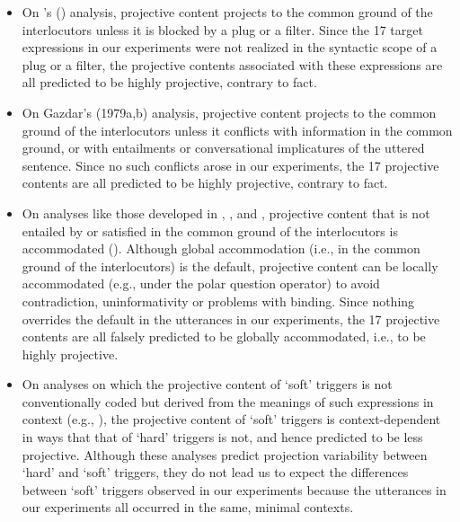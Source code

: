 \documentclass[11pt,fleqn]{article}
\newcommand{\6}{\mbox{$[\hspace*{-.6mm}[$}}
\newcommand{\9}{\mbox{$]\hspace*{-.6mm}]$}}
\newcommand{\citetpos}[1]{\citeauthor{#1}'s (\citeyear{#1})}
\begin{document}
\begin{itemize}[topsep=0pt,itemsep=-1pt]

\item On \citetpos{karttunen73} analysis, projective content projects to the common ground of the interlocutors unless it is blocked by a plug or a filter. Since the 17 target expressions in our experiments were not realized in the syntactic scope of a plug or a filter, the projective contents associated with these expressions are all predicted to be highly projective, contrary to fact.

\item On Gazdar's (1979a,b)\nocite{gazdar79a,gazdar79b} analysis, projective content projects to the common ground of the interlocutors unless it conflicts with information in the common ground, or with entailments or conversational implicatures of the uttered sentence. Since no such conflicts arose in our experiments, the 17 projective contents are all predicted to be highly projective, contrary to fact.

\item On analyses like those developed in \citealt{heim83}, \citealt{vds92}, \citealt{beaver-krahmer2001} and \citealt{vds-geurts01}, projective content that is not entailed by or satisfied in the common ground of the interlocutors is accommodated (\citealt{lewis79}). Although global accommodation (i.e., in the common ground of the interlocutors) is the default, projective content can be locally accommodated (e.g., under the polar question operator) to avoid contradiction, uninformativity or problems with binding. Since nothing overrides the default in the utterances in our experiments, the 17 projective contents are all falsely predicted to be globally accommodated, i.e., to be highly projective. 

\item On analyses on which the projective content of `soft' triggers is not conventionally coded but derived from the meanings of such expressions in context (e.g., \citealt{simons01,abusch02,abusch10,abbott06,chemla09b,romoli2015}), the projective content of `soft' triggers is context-dependent in ways that that of `hard' triggers is not, and hence predicted to be less projective. Although these analyses predict projection variability between `hard' and `soft' triggers, they do not lead us to expect the differences between `soft' triggers observed in our experiments because the utterances in our experiments all occurred in the same, minimal contexts.

\end{itemize}
\end{document}
